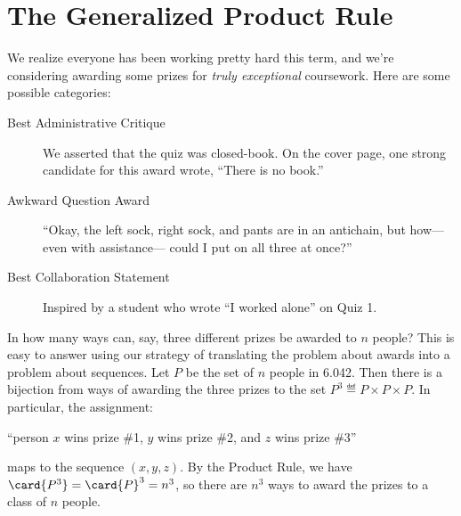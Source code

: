 \begin{problems}
\classproblems
{}

\homeworkproblems
{}
\end{problems}

\section{The Generalized Product Rule}\label{generalized_product_sec}

We realize everyone has been working pretty hard this term, and we're
considering awarding some prizes for \emph{truly exceptional}
coursework.  Here are some possible categories:

\begin{description}

\item[Best Administrative Critique] We asserted that the quiz was
closed-book.  On the cover page, one strong candidate for this award
wrote, ``There is no book.''

\item[Awkward Question Award] ``Okay, the left sock, right sock, and
pants are in an antichain, but how--- even with assistance--- could I
put on all three at once?''

\item[Best Collaboration Statement] Inspired by a student who wrote
``I worked alone'' on Quiz 1.

\end{description}

In how many ways can, say, three different prizes be awarded to $n$
people?  This is easy to answer using our strategy of translating the
problem about awards into a problem about sequences.  Let $P$ be the set
of $n$ people in 6.042.  Then there is a bijection from ways of awarding
the three prizes to the set $P^3 \eqdef P \times P \times P$.  In
particular, the assignment:
%
\begin{center}
``person $x$ wins prize \#1, $y$ wins prize \#2, and $z$ wins prize \#3''
\end{center}
%
maps to the sequence $(x, y, z)$.  By the Product Rule, we have
$\card{P^3}= \card{P}^3 = n^3$, so there are $n^3$ ways to award the
prizes to a class of $n$ people.

